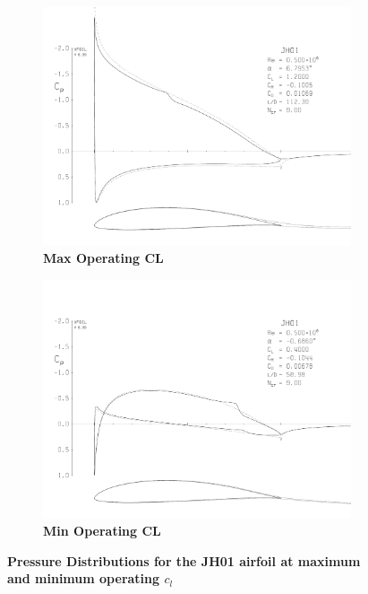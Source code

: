 \documentclass[journal]{aiaa-tc}%
\begin{document}
    \begin{figure}[h!]
    \begin{center}
         \begin{subfigure}{0.49\textwidth}
             \includegraphics{5_JH01_maxCl}
             \caption{ \textbf{Max Operating CL }}
         \end{subfigure}
         \begin{subfigure}{0.49\textwidth}
             \includegraphics{6_JH01_minCL}
             \caption{ \textbf{Min Operating CL} }
         \end{subfigure}
         \caption{ \textbf{Pressure Distributions for the JH01 airfoil at maximum and minimum operating $c_l$} }
    \label{f:JHpressure}
    \end{center}
    \end{figure}
    
\end{document}
